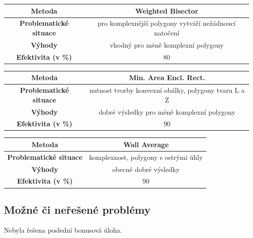 \documentclass[a4paper, 12pt, oneside, titlepage]{article} %
\begin{document}
\begin{table}[h!]
\centering
\begin{tabular}{|c|c|}
\hline
\textbf{Metoda}                & Weighted Bisector                                     \\ \hline
\textbf{Problematické situace} & pro komplexnější polygony vytváří nežádnoucí natočení \\ \hline
\textbf{Výhody}                & vhodný pro méně komplexní polygony                    \\ \hline
\textbf{Efektivita (v \%)}     & 80                                                    \\ \hline
\end{tabular}
\end{table}


\begin{table}[h!]
\centering
\begin{tabular}{|c|c|}
\hline
\textbf{Metoda}                & Min. Area Encl. Rect.                                \\ \hline
\textbf{Problematické situace} & nutnost tvorby konvexní obálky, polygony tvaru L a Z \\ \hline
\textbf{Výhody}                & dobré výsledky pro méně komplexní polygony           \\ \hline
\textbf{Efektivita (v \%)}     & 90                                                   \\ \hline
\end{tabular}
\end{table}


\begin{table}[h!]
\centering
\begin{tabular}{|c|c|}
\hline
\textbf{Metoda}                & Wall Average                         \\ \hline
\textbf{Problematické situace} & komplexnost, polygony s ostrými úhly \\ \hline
\textbf{Výhody}                & obecně dobré výsledky                \\ \hline
\textbf{Efektivita (v \%)}     & 90                                   \\ \hline
\end{tabular}
\end{table}
\FloatBarrier

\subsection{Možné či neřešené problémy} \label{mcn_problemy}
Nebyla řešena poslední bonusová úloha. 
\end{document}
